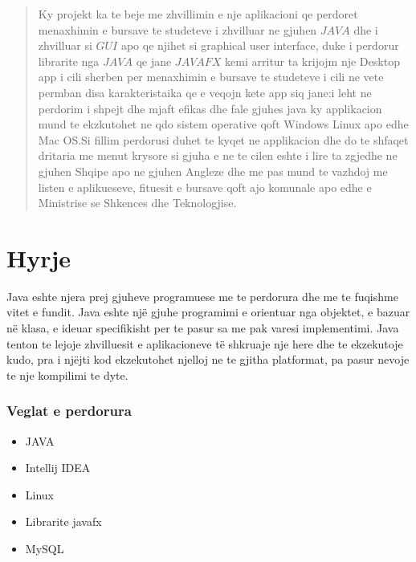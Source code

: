 \documentclass[a4paper]{article}
\begin{document}
\newpage 
\begin{abstract}
Ky projekt ka te beje me zhvillimin e nje aplikacioni qe perdoret menaxhimin  e bursave te studeteve i zhvilluar ne gjuhen $JAVA$ dhe i zhvilluar si $GUI$ apo qe  njihet si graphical user interface, duke i perdorur librarite nga $JAVA$ qe jane $JAVAFX$ kemi arritur ta krijojm nje Desktop app i cili sherben per menaxhimin e bursave te studeteve i cili ne vete  permban disa karakteristaika qe e veqojn kete app siq jane:i leht ne perdorim i shpejt dhe mjaft efikas dhe fale gjuhes java ky applikacion mund te ekzkutohet ne qdo sistem operative qoft Windows Linux apo edhe Mac OS.Si fillim perdorusi duhet te kyqet ne applikacion dhe do te shfaqet dritaria me menut krysore si gjuha e ne te cilen eshte i lire ta zgjedhe ne gjuhen Shqipe apo ne gjuhen Angleze dhe me pas mund te vazhdoj me listen e aplikueseve, fituesit e bursave  qoft ajo komunale apo edhe  e Ministrise se Shkences dhe Teknologjise.


\end{abstract}

\newpage
\tableofcontents
\newpage
\section{Hyrje}
Java eshte njera prej gjuheve programuese me te perdorura dhe me te fuqishme vitet e fundit. Java eshte një gjuhe programimi e orientuar nga objektet, e bazuar në klasa, e ideuar specifikisht per te pasur sa me pak varesi implementimi. Java tenton te lejoje zhvilluesit e aplikacioneve të shkruaje nje here dhe te ekzekutoje kudo, pra i njëjti kod ekzekutohet njelloj ne te gjitha platformat, pa pasur nevoje te nje kompilimi te dyte.
\subsubsection{Veglat e perdorura}
\begin{itemize}
\item JAVA
\item Intellij IDEA
\item Linux 
\item Librarite javafx
\item MySQL
\end{itemize}
\end{document}
